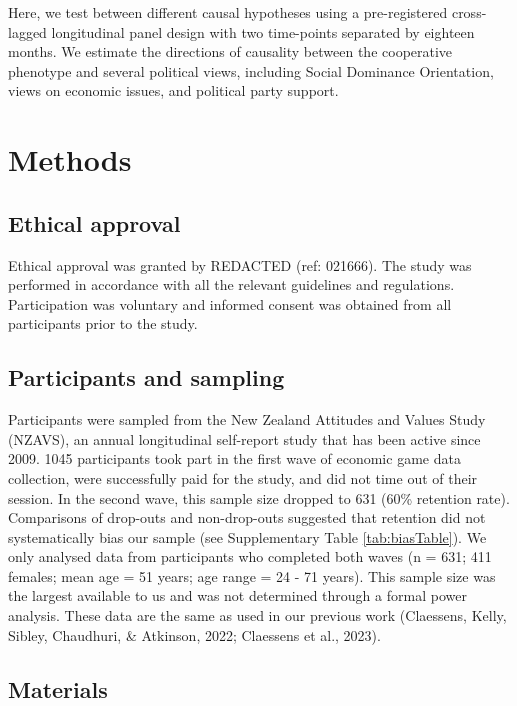 \documentclass[
  man,floatsintext]{apa6}
\begin{document}
Here, we test between different causal hypotheses using a pre-registered
cross-lagged longitudinal panel design with two time-points separated by
eighteen months. We estimate the directions of causality between the cooperative
phenotype and several political views, including Social Dominance Orientation,
views on economic issues, and political party support.

\hypertarget{methods}{%
\section{Methods}\label{methods}}

\hypertarget{ethical-approval}{%
\subsection{Ethical approval}\label{ethical-approval}}

Ethical approval was granted by REDACTED (ref: 021666). The study was performed
in accordance with all the relevant guidelines and regulations. Participation
was voluntary and informed consent was obtained from all participants prior to
the study.

\hypertarget{participants-and-sampling}{%
\subsection{Participants and sampling}\label{participants-and-sampling}}

Participants were sampled from the New Zealand Attitudes and Values Study
(NZAVS), an annual longitudinal self-report study that has been active since
2009. 1045 participants took part in the first wave of economic game data
collection, were successfully paid for the study, and did not time out
of their session. In the second wave, this sample size dropped to 631
(60\% retention rate). Comparisons of drop-outs and non-drop-outs suggested that
retention did not systematically bias our sample (see Supplementary Table
\ref{tab:biasTable}). We only analysed data from participants who completed
both waves (n = 631;
411 females; mean age =
51 years; age range =
24 -
71 years). This sample size was
the largest available to us and was not determined through a formal power
analysis. These data are the same as used in our previous work
(Claessens, Kelly, Sibley, Chaudhuri, \& Atkinson, 2022; Claessens et al., 2023).

\hypertarget{materials}{%
\subsection{Materials}\label{materials}}
\end{document}
